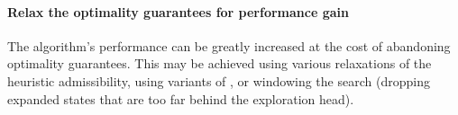 \paragraph{Relax the \A optimality guarantees for performance gain}
The algorithm's performance can be greatly increased at the cost of abandoning
optimality guarantees. This may be achieved using various relaxations of the
heuristic admissibility, using variants of \A, or windowing the search (dropping
expanded states that are too far behind the exploration head).

%

